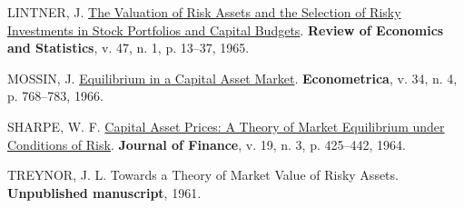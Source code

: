 \documentclass[
  12pt,
  a4paperpaper,
]{article}
\newlength{\cslhangindent}
\newenvironment{CSLReferences}[2] %
 {\begin{list}{}{%
  \setlength{\itemindent}{0pt}
  \setlength{\leftmargin}{0pt}
  \setlength{\parsep}{0pt}
  \ifodd #1
   \setlength{\leftmargin}{\cslhangindent}
   \setlength{\itemindent}{-1\cslhangindent}
  \fi
  \setlength{\itemsep}{#2\baselineskip}}}
 {\end{list}}
\begin{document}
\label{refs}
\begin{CSLReferences}{0}{0}
LINTNER, J. \href{https://doi.org/10.2307/1924119}{The Valuation of Risk
Assets and the Selection of Risky Investments in Stock Portfolios and
Capital Budgets}. \textbf{Review of Economics and Statistics}, v. 47, n.
1, p. 13--37, 1965.

MOSSIN, J. \href{https://doi.org/10.2307/1910098}{Equilibrium in a
Capital Asset Market}. \textbf{Econometrica}, v. 34, n. 4, p. 768--783,
1966.

SHARPE, W. F. \href{https://doi.org/10.2307/2977928}{Capital Asset
Prices: A Theory of Market Equilibrium under Conditions of Risk}.
\textbf{Journal of Finance}, v. 19, n. 3, p. 425--442, 1964.

TREYNOR, J. L. Towards a Theory of Market Value of Risky Assets.
\textbf{Unpublished manuscript}, 1961.

\end{CSLReferences}
\end{document}

